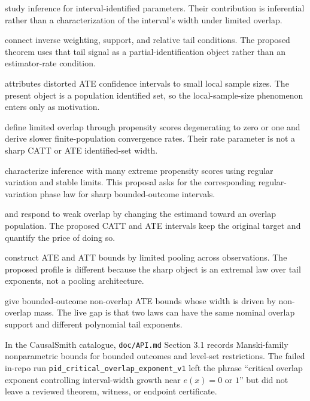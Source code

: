 \documentclass[11pt]{article}
\theoremstyle{definition}
\theoremstyle{plain}
\theoremstyle{remark}
\begin{document}
\citet{ImbensManski2004ConfidenceIntervals} study inference for interval-identified parameters.  Their contribution is inferential rather than a characterization of the interval's width under limited overlap.

\citet[p.~2021]{KhanTamer2010IrregularIdentification} connect inverse weighting, support, and relative tail conditions.  The proposed theorem uses that tail signal as a partial-identification object rather than an estimator-rate condition.

\citet{Rothe2017LimitedOverlapCI} attributes distorted ATE confidence intervals to small local sample sizes.  The present object is a population identified set, so the local-sample-size phenomenon enters only as motivation.

\citet{HongLeungLi2020FinitePopulationLimitedOverlap} define limited overlap through propensity scores degenerating to zero or one and derive slower finite-population convergence rates.  Their rate parameter is not a sharp CATT or ATE identified-set width.

\citet{HeilerKazak2021ExtremePropensity} characterize inference with many extreme propensity scores using regular variation and stable limits.  This proposal asks for the corresponding regular-variation phase law for sharp bounded-outcome intervals.

\citet{CrumpHotzImbensMitnik2009LimitedOverlap} and \citet{LiMorganZaslavsky2018OverlapWeights} respond to weak overlap by changing the estimand toward an overlap population.  The proposed CATT and ATE intervals keep the original target and quantify the price of doing so.

\citet{LeeWeidner2026LimitedPoolingBounds} construct ATE and ATT bounds by limited pooling across observations.  The proposed profile is different because the sharp object is an extremal law over tail exponents, not a pooling architecture.

\citet{SusmannMcCleanDiaz2025NonOverlapATEBounds} give bounded-outcome non-overlap ATE bounds whose width is driven by non-overlap mass.  The live gap is that two laws can have the same nominal overlap support and different polynomial tail exponents.

In the CausalSmith catalogue, \texttt{doc/API.md} Section 3.1 records Manski-family nonparametric bounds for bounded outcomes and level-set restrictions.  The failed in-repo run \texttt{pid\_critical\_overlap\_exponent\_v1} left the phrase ``critical overlap exponent controlling interval-width growth near \(e(x)=0\) or \(1\)'' but did not leave a reviewed theorem, witness, or endpoint certificate.
\end{document}
